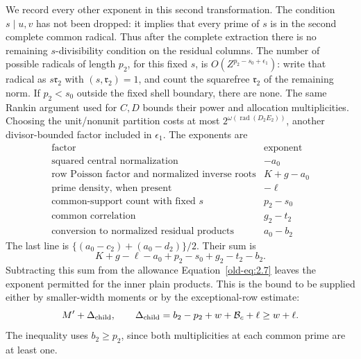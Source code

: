\documentclass[11pt,a4paper]{article}
\numberwithin{equation}{section}
\numberwithin{figure}{section}
\theoremstyle{definition}
\theoremstyle{remark}
\begin{document}
We record every other exponent in this second transformation.  The
condition \(s\mid u,v\) has not been dropped: it implies that every
prime of \(s\) is in the second complete common radical.  Thus after the complete extraction there is no remaining
\(s\)-divisibility condition on the residual columns.  The number of
possible radicals of length \(p_2\), for this fixed
\(s\), is \(O(Z^{p_2-s_0+\epsilon_1})\): write that radical as
\(s\mathfrak r_2\) with \((s,\mathfrak r_2)=1\), and count the
squarefree \(\mathfrak r_2\) of the remaining norm.  If \(p_2<s_0\)
outside the fixed shell boundary, there are none.  The same Rankin
argument used for \(C,D\) bounds their power and allocation
multiplicities.  Choosing the unit/nonunit partition costs at most
\(2^{\omega(\operatorname{rad}(D_2E_2))}\), another divisor-bounded
factor included in \(\epsilon_1\).  The exponents are
\[
 \begin{array}{l|r}
 \text{factor}&\text{exponent}\\ \hline
 \text{squared central normalization}&-a_0\\
 \text{row Poisson factor and normalized inverse roots}&K+g-a_0\\
 \text{prime density, when present}&-\ell\\
 \text{common-support count with fixed }s&p_2-s_0\\
 \text{common correlation}&g_2-t_2\\
 \text{conversion to normalized residual products}&a_0-b_2
 \end{array}
\]
The last line is
\(\{(a_0-c_2)+(a_0-d_2)\}/2\).
Their sum is
\[
 K+g-\ell-a_0+p_2-s_0+g_2-t_2-b_2.
\]
Subtracting this sum from the allowance
Equation~\eqref{old-eq:2.7} leaves the exponent permitted for
the inner plain products.  This is the bound to be supplied either by
smaller-width moments or by the exceptional-row estimate:
\begin{equation}
 M'+\Delta_{\rm child},\qquad
 \Delta_{\rm child}=b_2-p_2+w+\mathcal B_c+\ell
                   \ge w+\ell.
 \label{old-eq:2.14}
\end{equation}
The inequality uses \(b_2\ge p_2\), since both multiplicities
at each common prime are at least one.
\end{document}
